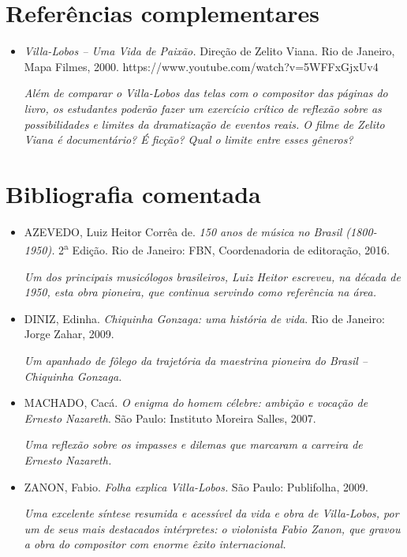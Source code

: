 \documentclass[11pt]{extarticle}
\begin{document}
\section{Referências complementares}

\begin{itemize}

\item 
\emph{Villa-Lobos -- Uma Vida de Paixão.} Direção de Zelito Viana. Rio
de Janeiro, Mapa Filmes, 2000.
https://www.youtube.com/watch?v=5WFFxGjxUv4

\emph{Além de comparar o Villa-Lobos das telas com o compositor das
páginas do livro, os estudantes poderão fazer um exercício crítico de
reflexão sobre as possibilidades e limites da dramatização de eventos
reais. O filme de Zelito Viana é documentário? É ficção? Qual o limite
entre esses gêneros? }
\end{itemize}

\section{Bibliografia comentada}

\begin{itemize}
	
\item 
AZEVEDO, Luiz Heitor Corrêa de. \emph{150 anos de música no Brasil
(1800-1950).} 2\textsuperscript{a} Edição. Rio de Janeiro: FBN,
Coordenadoria de editoração, 2016.


\emph{Um dos principais musicólogos brasileiros, Luiz Heitor escreveu,
na década de 1950, esta obra pioneira, que continua servindo como
referência na área. }

\item 
DINIZ, Edinha. \emph{Chiquinha Gonzaga: uma história de vida}. Rio de
Janeiro: Jorge Zahar, 2009.


\emph{Um apanhado de fôlego da trajetória da maestrina pioneira do
Brasil -- Chiquinha Gonzaga. }

\item 
MACHADO, Cacá. \emph{O enigma do homem célebre: ambição e vocação de
Ernesto Nazareth}. São Paulo: Instituto Moreira Salles, 2007.


\emph{Uma reflexão sobre os impasses e dilemas que marcaram a carreira
de Ernesto Nazareth. }

\item 
ZANON, Fabio. \emph{Folha explica Villa-Lobos.} São Paulo: Publifolha,
2009.


\emph{Uma excelente síntese resumida e acessível da vida e obra de
Villa-Lobos, por um de seus mais destacados intérpretes: o violonista
Fabio Zanon, que gravou a obra do compositor com enorme êxito
internacional. }
\end{itemize}
\end{document}
